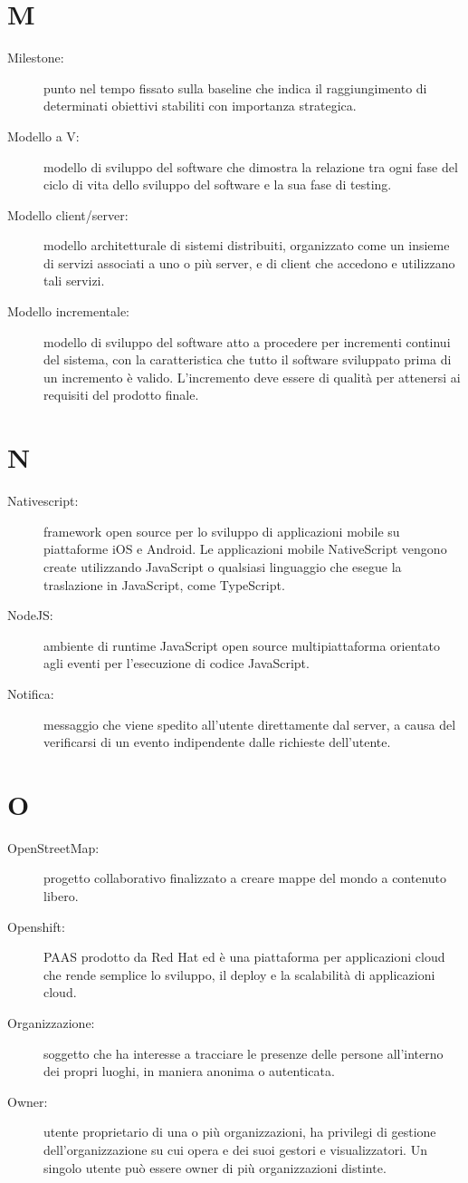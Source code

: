 \documentclass{article}
\begin{document}
	\section{M}
	\begin{description}
		\item[Milestone:] punto nel tempo fissato sulla baseline che indica il raggiungimento di determinati obiettivi stabiliti con importanza strategica.
		\item[Modello a V:] modello di sviluppo del software che dimostra la relazione tra ogni fase del ciclo di vita dello sviluppo del software e la sua fase di testing.
		\item[Modello client/server:] modello architetturale di sistemi distribuiti, organizzato come un insieme di servizi associati a uno o più server, e di client che accedono e utilizzano tali servizi.
		\item[Modello incrementale:] modello di sviluppo del software atto a procedere per incrementi continui del sistema, con la caratteristica che tutto il software sviluppato prima di un incremento è valido. L'incremento deve essere di qualità per attenersi ai requisiti del prodotto finale.
	\end{description}
	\newpage
	\section{N}
	\begin{description}
		\item[Nativescript:] framework open source per lo sviluppo di applicazioni mobile su piattaforme iOS e Android. Le applicazioni mobile NativeScript vengono create utilizzando JavaScript o qualsiasi linguaggio che esegue la traslazione in JavaScript, come TypeScript.
		\item[NodeJS:] ambiente di runtime JavaScript open source multipiattaforma orientato agli eventi per l'esecuzione di codice JavaScript.
		\item[Notifica:] messaggio che viene spedito all'utente direttamente dal server, a causa del verificarsi di un evento indipendente dalle richieste dell'utente.
	\end{description}
	\newpage
	\section{O}
	\begin{description}
		\item[OpenStreetMap:] progetto collaborativo finalizzato a creare mappe del mondo a contenuto libero.
		\item[Openshift:] PAAS prodotto da Red Hat ed è una piattaforma per applicazioni cloud che rende semplice lo sviluppo, il deploy e la scalabilità di applicazioni cloud.
		\item[Organizzazione:] soggetto che ha interesse a tracciare le presenze delle persone all'interno dei propri luoghi, in maniera anonima o autenticata.
		\item[Owner:] utente proprietario di una o più organizzazioni, ha privilegi di gestione dell'organizzazione su cui opera e dei suoi gestori e visualizzatori. Un singolo utente può essere owner di più organizzazioni distinte.
	\end{description}
	\newpage
\end{document}
